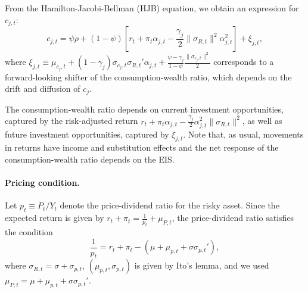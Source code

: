 From the Hamilton-Jacobi-Bellman (HJB) equation, we obtain an expression for $c_{j,t}$:
\begin{equation}\label{eq:xi_j}
    c_{j,t} = \psi \rho + (1-\psi) \left[ r_t + \pi_t \alpha_{j,t} - \frac{\gamma_j}{2} \|\sigma_{R,t}\|^2 \alpha_{j,t}^2\right] + \xi_{j,t},
\end{equation}
where $\xi_{j,t} \equiv \mu_{c_j,t} + (1-\gamma_j)  \sigma_{c_j,t} \sigma_{R,t}' \alpha_{j,t} + \frac{\psi - \gamma_j}{1-\psi} \frac{\|\sigma_{c_j,t}\|^2}{2}$ corresponds to a forward-looking shifter of the consumption-wealth ratio, which depends on the drift and diffusion of $c_j$.


The consumption-wealth ratio depends on current investment opportunities, captured by the risk-adjusted return $r_t + \pi_t \alpha_{j,t} - \frac{\gamma_j}{2} \alpha_{j,t}^2 \|\sigma_{R,t}\|^2$, as well as future investment opportunities, captured by $\xi_{j,t}$. Note that, as usual, movements in returns have income and substitution effects and the net response of the consumption-wealth ratio depends on the EIS.

\paragraph{Pricing condition.} Let $p_t \equiv P_t/Y_t$ denote the price-dividend ratio for the risky asset. Since the expected return is given by $r_t + \pi_t = \frac{1}{p_t} + \mu_{P,t}$, the price-dividend ratio satisfies the condition
\begin{equation}\label{eq:pricing_cond}
    \frac{1}{p_t} = r_t + \pi_t  -(\mu + \mu_{p,t} + \sigma \sigma_{p,t}'),
\end{equation}
where $\sigma_{R,t} = \sigma + \sigma_{p,t}$, $(\mu_{p,t}, \sigma_{p,t})$ is given by Ito's lemma, and we used $\mu_{P,t} =\mu + \mu_{p,t} + \sigma \sigma_{p,t}' $. 

